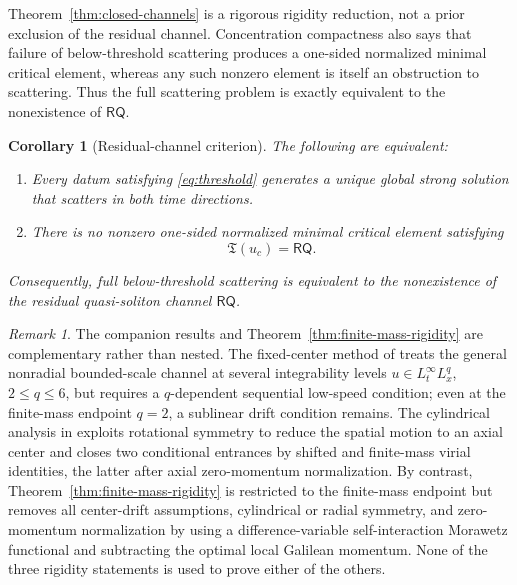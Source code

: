 \documentclass{interact}
\numberwithin{equation}{section}
\theoremstyle{plain}
\newtheorem{corollary}[theorem]{Corollary}
\theoremstyle{definition}
\theoremstyle{remark}
\newtheorem{remark}[theorem]{Remark}
\begin{document}
Theorem~\ref{thm:closed-channels} is a rigorous rigidity reduction, not a prior exclusion of the residual channel. Concentration compactness also says that failure of below-threshold scattering produces a one-sided normalized minimal critical element, whereas any such nonzero element is itself an obstruction to scattering. Thus the full scattering problem is exactly equivalent to the nonexistence of $\mathsf{RQ}$.

\begin{corollary}[Residual-channel criterion]\label{cor:residual-channel}
The following are equivalent:
\begin{enumerate}[label=\textup{(\alph*)},leftmargin=2.4em]
 \item Every datum satisfying \eqref{eq:threshold} generates a unique global strong solution that scatters in both time directions.
 \item There is no nonzero one-sided normalized minimal critical element satisfying
 \[
  \mathfrak T(u_c)=\mathsf{RQ}.
 \]
\end{enumerate}
Consequently, full below-threshold scattering is equivalent to the nonexistence of the residual quasi-soliton channel $\mathsf{RQ}$.
\end{corollary}

\begin{remark}\label{rem:relation-low-speed}
The companion results \cite{ChungHan2026,ChungHanCylindrical2026} and Theorem~\ref{thm:finite-mass-rigidity} are complementary rather than nested. The fixed-center method of \cite{ChungHan2026} treats the general nonradial bounded-scale channel at several integrability levels $u\in L_t^\infty L_x^q$, $2\le q\le6$, but requires a $q$-dependent sequential low-speed condition; even at the finite-mass endpoint $q=2$, a sublinear drift condition remains. The cylindrical analysis in \cite{ChungHanCylindrical2026} exploits rotational symmetry to reduce the spatial motion to an axial center and closes two conditional entrances by shifted and finite-mass virial identities, the latter after axial zero-momentum normalization. By contrast, Theorem~\ref{thm:finite-mass-rigidity} is restricted to the finite-mass endpoint but removes all center-drift assumptions, cylindrical or radial symmetry, and zero-momentum normalization by using a difference-variable self-interaction Morawetz functional and subtracting the optimal local Galilean momentum. None of the three rigidity statements is used to prove either of the others.
\end{remark}
\end{document}

